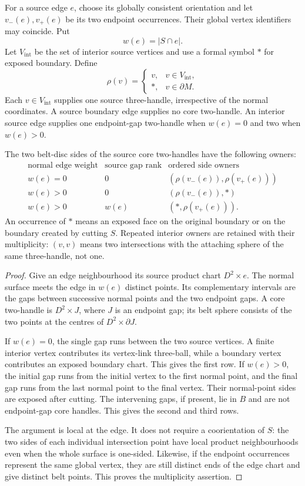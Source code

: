 For a source edge $e$, choose its globally consistent orientation and let
$v_-(e),v_+(e)$ be its two endpoint occurrences.  Their global vertex
identifiers may coincide.  Put
\[
  w(e)=|S\cap e|.
\]
Let $V_{\mathrm{int}}$ be the set of interior source vertices and use a
formal symbol $\ast$ for exposed boundary.  Define
\[
 \rho(v)=
 \begin{cases}
   v,&v\in V_{\mathrm{int}},\\
   \ast,&v\in\partial M.
 \end{cases}
\]
Each $v\in V_{\mathrm{int}}$ supplies one source three-handle, irrespective
of the normal coordinates.  A source boundary edge supplies no core
two-handle.  An interior source edge supplies one endpoint-gap two-handle
when $w(e)=0$ and two when $w(e)>0$.

\begin{lemma}
\label{lem:cut-dual-sides}
The two belt-disc sides of the source core two-handles have the following
owners:
\[
\begin{array}{c|c|c}
 \text{normal edge weight}&\text{source gap rank}&\text{ordered side owners}\\
 \hline
 w(e)=0&0&(\rho(v_-(e)),\rho(v_+(e)))\\
 w(e)>0&0&(\rho(v_-(e)),\ast)\\
 w(e)>0&w(e)&(\ast,\rho(v_+(e))).
\end{array}
\]
An occurrence of $\ast$ means an exposed face on the original boundary
or on the boundary created by cutting $S$.  Repeated interior owners are
retained with their multiplicity: $(v,v)$ means two intersections with
the attaching sphere of the same three-handle, not one.
\end{lemma}

\begin{proof}
Give an edge neighbourhood its source product chart
$D^2\times e$.  The normal surface meets the edge in $w(e)$ distinct
points.  Its complementary intervals are the gaps between successive
normal points and the two endpoint gaps.  A core two-handle is
$D^2\times J$, where $J$ is an endpoint gap; its belt sphere consists of
the two points at the centres of $D^2\times\partial J$.

If $w(e)=0$, the single gap runs between the two source vertices.  A
finite interior vertex contributes its vertex-link three-ball, while a
boundary vertex contributes an exposed boundary chart.  This gives the
first row.  If $w(e)>0$, the initial gap runs from the initial vertex to
the first normal point, and the final gap runs from the last normal point
to the final vertex.  Their normal-point sides are exposed after cutting.
The intervening gaps, if present, lie in $B$ and are not endpoint-gap
core handles.  This gives the second and third rows.

The argument is local at the edge.  It does not require a coorientation
of $S$: the two sides of each individual intersection point have local
product neighbourhoods even when the whole surface is one-sided.
Likewise, if the endpoint occurrences represent the same global vertex,
they are still distinct ends of the edge chart and give distinct belt
points.  This proves the multiplicity assertion.
\end{proof}

